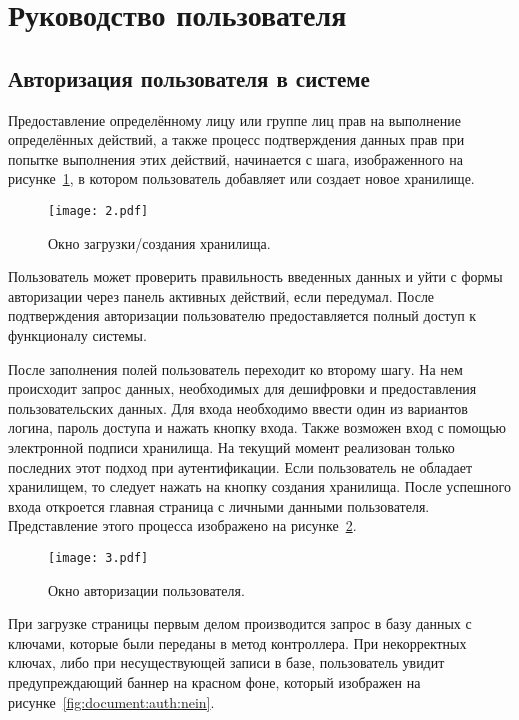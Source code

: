 \section{Руководство пользователя}
\label{sec:document}

\subsection{Авторизация пользователя в системе}
\label{sec:document:auth}

Предоставление определённому лицу или группе лиц прав на выполнение определённых действий, а также процесс подтверждения данных прав при попытке выполнения этих действий, начинается с шага, изображенного на рисунке~\ref{fig:document:auth:two}, в котором пользователь добавляет или создает новое хранилище.

\begin{figure}[ht]
\centering
  \texttt{[image: 2.pdf]}
  \caption{ Окно загрузки/создания хранилища. }
  \label{fig:document:auth:two}
\end{figure}

Пользователь может проверить правильность введенных данных и уйти с формы авторизации через панель активных действий, если передумал. После подтверждения авторизации пользователю предоставляется полный доступ к функционалу системы.

После заполнения полей пользователь переходит ко второму шагу. На нем происходит запрос данных, необходимых для дешифровки и предоставления пользовательских данных. Для входа необходимо ввести один из вариантов логина, пароль доступа и нажать кнопку входа. Также
возможен вход с помощью электронной подписи хранилища. На текущий момент реализован только последних этот подход при аутентификации. Если
пользователь не обладает хранилищем, то следует нажать на кнопку создания хранилища.
После успешного входа откроется главная страница с личными данными пользователя. Представление этого процесса изображено на рисунке~\ref{fig:document:auth:therd}.

\begin{figure}[ht]
\centering
  \texttt{[image: 3.pdf]}
  \caption{ Окно авторизации пользователя. }
  \label{fig:document:auth:therd}
\end{figure}

При загрузке страницы первым делом производится запрос в базу данных с ключами, которые были переданы в метод контроллера. При некорректных ключах, либо при несуществующей записи в базе, пользователь увидит предупреждающий баннер на красном фоне, который изображен на рисунке~\ref{fig:document:auth:nein}.

